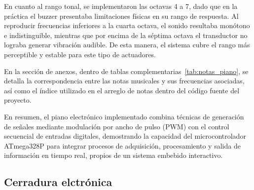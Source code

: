 En cuanto al rango tonal, se implementaron las octavas 4 a 7, dado que en la práctica el buzzer presentaba limitaciones físicas en su rango de respuesta. 
Al reproducir frecuencias inferiores a la cuarta octava, el sonido resultaba monótono e indistinguible, mientras que por encima de la séptima octava el transductor no lograba generar vibración audible. 
De esta manera, el sistema cubre el rango más perceptible y estable para este tipo de actuadores.

En la sección de anexos, dentro de tablas complementarias~\ref{tab:notas_piano}, 
se detalla la correspondencia entre las notas musicales y sus frecuencias asociadas, 
así como el índice utilizado en el arreglo de notas dentro del código fuente del proyecto.

En resumen, el piano electrónico implementado combina técnicas de generación de señales mediante modulación por ancho de pulso (PWM) con el control secuencial de entradas digitales, demostrando la capacidad del microcontrolador ATmega328P para integrar procesos de adquisición, procesamiento y salida de información en tiempo real, propios de un sistema embebido interactivo.
\subsection{Cerradura elctrónica}


